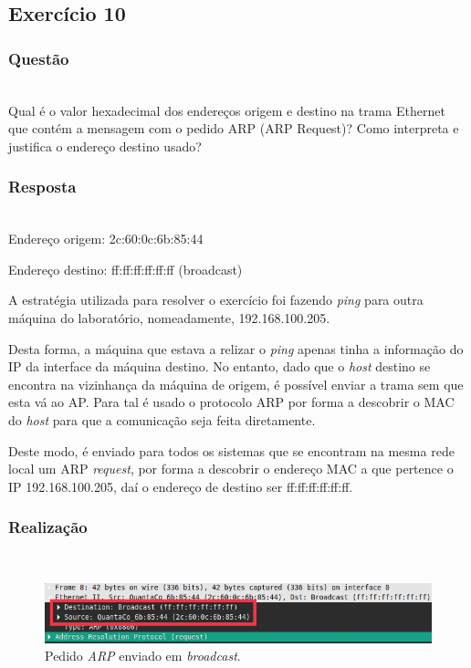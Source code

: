\documentclass{llncs}
\begin{document}
\clearpage
\subsection{Exercício 10}
\subsubsection{Questão}\rule[-10pt]{0pt}{10pt}\\

Qual é o valor hexadecimal dos endereços origem e destino na trama Ethernet que contém a mensagem com o pedido ARP (ARP Request)? Como interpreta e justifica o endereço destino usado?

\subsubsection{Resposta}\rule[-10pt]{0pt}{10pt}\\

Endereço origem: 2c:60:0c:6b:85:44

Endereço destino: ff:ff:ff:ff:ff:ff (broadcast)

A estratégia utilizada para resolver o exercício foi fazendo \textit{ping} para outra máquina do laboratório, nomeadamente, 192.168.100.205.

Desta forma, a máquina que estava a relizar o \textit{ping} apenas tinha a informação do IP da interface da máquina destino. No entanto, dado que o \textit{host} destino se encontra na vizinhança da máquina de origem, é possível enviar a trama sem que esta vá ao AP. Para tal é usado o protocolo ARP por forma a descobrir o MAC do \textit{host} para que a comunicação seja feita diretamente.

Deste modo, é enviado para todos os sistemas que se encontram na mesma rede local um ARP \textit{request}, por forma a descobrir o endereço MAC a que pertence o IP 192.168.100.205, daí o endereço de destino ser ff:ff:ff:ff:ff:ff. 

\subsubsection{Realização}\rule[-10pt]{0pt}{10pt}\\

\begin{figure}
  \begin{center}
	  \includegraphics[scale=0.6]{./imagens/arp_request.png} 
  \end{center}
	\caption{Pedido \textit{ARP} enviado em \textit{broadcast}.}
  \label{fig:arp_request}
\end{figure} 
\end{document}
